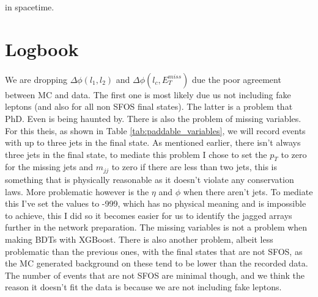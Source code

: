 \documentclass[12pt, a4paper]{book}
\begin{document}
in spacetime.
\clearpage


\appendix















\chapter*{Logbook}

We are dropping $\Delta\phi(l_1,l_2)$ and $\Delta\phi(l_c,E_T^{miss})$ due the poor agreement between MC and data. The first one is most likely due us not including fake leptons (and also for all non SFOS final states). The latter is a problem that PhD. Even is being haunted by. 
There is also the problem of missing variables. For this theis, as shown in Table \ref{tab:paddable_variables}, we will record events with up to three jets in the final state. As mentioned earlier, there isn't 
always three jets in the final state, to mediate this problem I chose to set the $p_T$ to zero for the missing jets and $m_{jj}$ to zero if there are less than two jets, this is something that is physically reasonable as it doesn't violate any conservation laws. 
More problematic however is the $\eta$ and $\phi$ when there aren't jets. To mediate this I've set the values to -999, which has no physical meaning and is impossible to achieve, this I did so it becomes easier for us to identify the jagged arrays further in the network preparation. 
The missing variables is not a problem when making BDTs with XGBoost. There is also another problem, albeit less problematic than the previous ones, with the final states that are not SFOS, as the MC generated background 
on these tend to be lower than the recorded data. The number of events that are not SFOS are minimal though, and we think the reason it doesn't fit the data is because we are not including fake leptons. 
\end{document}
